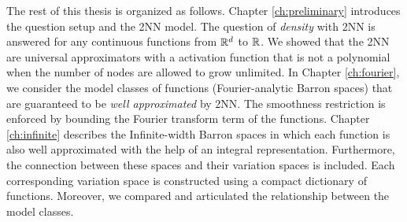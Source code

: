 


The rest of this thesis is organized as follows. Chapter \ref{ch:preliminary}
introduces the question setup and the 2NN model. The question of
\textit{density} with 2NN is answered for any continuous functions from $\mathbb{R}^d$
to $\mathbb{R}$. We showed that the 2NN are universal approximators with a activation
function that is not a polynomial when the number of nodes are allowed to grow
unlimited. In Chapter \ref{ch:fourier}, we consider the model classes of
functions (Fourier-analytic Barron spaces) that are guaranteed to be
\textit{well approximated} by 2NN. The smoothness restriction is enforced by
bounding the Fourier transform term of the functions. Chapter \ref{ch:infinite}
describes the Infinite-width Barron spaces in which each function is also well
approximated with the help of an integral representation. Furthermore, the
connection between these spaces and their variation spaces is included. Each
corresponding variation space is constructed using a compact dictionary of
functions. Moreover, we compared and articulated the relationship between the
model classes.

